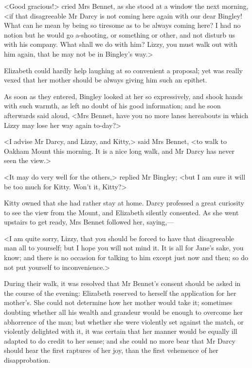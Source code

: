 <Good gracious!> cried Mrs Bennet, as she stood at a window the next morning, <if that disagreeable Mr Darcy is not coming here again with our dear Bingley! What can he mean by being so tiresome as to be always coming here? I had no notion but he would go a-shooting, or something or other, and not disturb us with his company. What shall we do with him? Lizzy, you must walk out with him again, that he may not be in Bingley's way.>

Elizabeth could hardly help laughing at so convenient a proposal; yet was really vexed that her mother should be always giving him such an epithet.

As soon as they entered, Bingley looked at her so expressively, and shook hands with such warmth, as left no doubt of his good information; and he soon afterwards said aloud, <Mrs Bennet, have you no more lanes hereabouts in which Lizzy may lose her way again to-day?>

<I advise Mr Darcy, and Lizzy, and Kitty,> said Mrs Bennet, <to walk to Oakham Mount this morning. It is a nice long walk, and Mr Darcy has never seen the view.>

<It may do very well for the others,> replied Mr Bingley; <but I am sure it will be too much for Kitty. Won't it, Kitty?>

Kitty owned that she had rather stay at home. Darcy professed a great curiosity to see the view from the Mount, and Elizabeth silently consented. As she went upstairs to get ready, Mrs Bennet followed her, saying,—

<I am quite sorry, Lizzy, that you should be forced to have that disagreeable man all to yourself; but I hope you will not mind it. It is all for Jane's sake, you know; and there is no occasion for talking to him except just now and then; so do not put yourself to inconvenience.>

During their walk, it was resolved that Mr Bennet's consent should be asked in the course of the evening: Elizabeth reserved to herself the application for her mother's. She could not determine how her mother would take it; sometimes doubting whether all his wealth and grandeur would be enough to overcome her abhorrence of the man; but whether she were violently set against the match, or violently delighted with it, it was certain that her manner would be equally ill adapted to do credit to her sense; and she could no more bear that Mr Darcy should hear the first raptures of her joy, than the first vehemence of her disapprobation.

